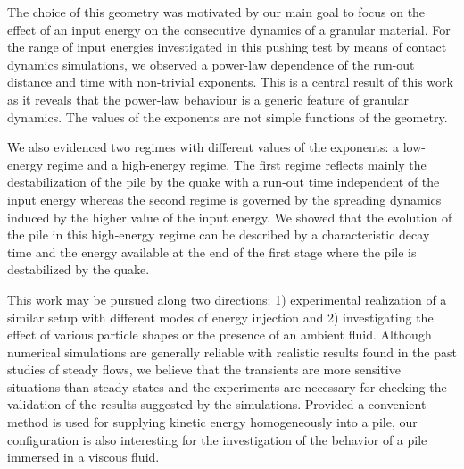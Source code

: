 The choice of this geometry was motivated by our main goal  to focus on the 
effect of an input energy on the consecutive dynamics of a granular material.
For the range of input energies investigated in this pushing test by means of 
contact dynamics simulations, we observed a power-law dependence of the 
run-out distance and time with non-trivial exponents. This is a central result 
of this work as it reveals that the power-law behaviour is a generic feature of 
granular dynamics. The values of the exponents are not simple functions of 
the geometry. 

We also evidenced two regimes with different values of the exponents: 
a low-energy regime and a high-energy regime. The first regime  
reflects mainly the destabilization of the pile by the quake with a run-out time 
independent of the input energy whereas the second regime is governed by the 
spreading dynamics induced by the higher value of the input energy. We showed 
that the evolution of the pile in this high-energy regime can be described by a 
characteristic decay time and the energy available at the end of the first 
stage where the pile is destabilized by the quake. 

This work may be pursued along two directions: 1) experimental 
realization of a similar setup with different modes of energy injection and 
2) investigating the effect of various particle shapes or the presence of an 
ambient fluid. Although numerical simulations are generally reliable 
with realistic results found in the past studies of steady flows, we believe 
that the transients are more sensitive situations than steady states and the  
experiments are necessary for checking the validation of the results suggested 
by the simulations. Provided a convenient method is used for supplying kinetic 
energy homogeneously into a pile, our configuration is also interesting for 
the investigation of the behavior of a pile immersed in a viscous 
fluid.

